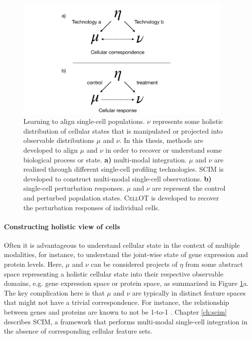 \begin{figure}[htp]
  \begin{center}
    \includegraphics[width=0.95\textwidth]{figures/introduction/thesis-overview-pgm.pdf}
  \end{center}
  \caption{Learning to align single-cell populations. $\nu$ represents some holistic distribution of cellular states that is manipulated or projected into observable distributions $\mu$ and $\nu$.
  In this thesis, methods are developed to align $\mu$ and $\nu$ in order to recover or understand some biological process or state.
  \textbf{a)} multi-modal integration. $\mu$ and $\nu$ are realized through different single-cell profiling technologies. \textsc{SCIM} \cite{stark2020} is developed to construct multi-modal single-cell observations.
    \textbf{b)} single-cell perturbation responses. $\mu$ and $\nu$ are represent the control and perturbed population states. \textsc{CellOT} \cite{bunne2023} is developed to recover the perturbation responses of individual cells.
  }\label{fig:thesis-overview-pgm}
\end{figure}

\paragraph{Constructing holistic view of cells}
Often it is advantageous to understand cellular state in the context of multiple modalities,
for instance, to understand the joint-wise state of gene expression and protein levels.
Here, $\mu$ and $\nu$ can be considered projects of $\eta$ from some abstract space representing a holistic cellular state into their respective observable domains, e.g. gene expression space or protein space, as summarized in Figure \ref{fig:thesis-overview-pgm}a.
The key complication here is that $\mu$ and $\nu$ are typically in distinct feature spaces that might not have a trivial correspondence.
For instance, the relationship between genes and proteins are known to not be 1-to-1 \cite{edfors2016}.
Chapter \ref{ch:scim} describes SCIM, a framework that performs multi-modal single-cell integration in the absence of corresponding cellular feature sets.

